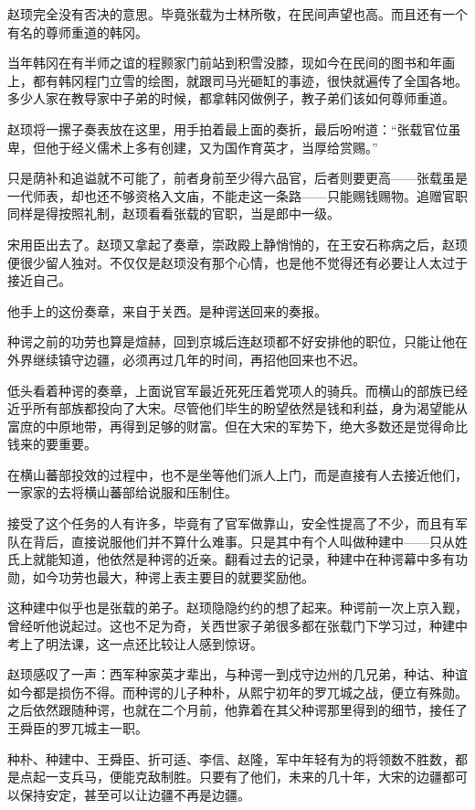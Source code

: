 赵顼完全没有否决的意思。毕竟张载为士林所敬，在民间声望也高。而且还有一个有名的尊师重道的韩冈。

当年韩冈在有半师之谊的程颢家门前站到积雪没膝，现如今在民间的图书和年画上，都有韩冈程门立雪的绘图，就跟司马光砸缸的事迹，很快就遍传了全国各地。多少人家在教导家中子弟的时候，都拿韩冈做例子，教子弟们该如何尊师重道。

赵顼将一摞子奏表放在这里，用手拍着最上面的奏折，最后吩咐道：“张载官位虽卑，但他于经义儒术上多有创建，又为国作育英才，当厚给赏赐。”

只是荫补和追谥就不可能了，前者身前至少得六品官，后者则要更高——张载虽是一代师表，却也还不够资格入文庙，不能走这一条路——只能赐钱赐物。追赠官职同样是得按照礼制，赵顼看看张载的官职，当是郎中一级。

宋用臣出去了。赵顼又拿起了奏章，崇政殿上静悄悄的，在王安石称病之后，赵顼便很少留人独对。不仅仅是赵顼没有那个心情，也是他不觉得还有必要让人太过于接近自己。

他手上的这份奏章，来自于关西。是种谔送回来的奏报。

种谔之前的功劳也算是煊赫，回到京城后连赵顼都不好安排他的职位，只能让他在外界继续镇守边疆，必须再过几年的时间，再招他回来也不迟。

低头看着种谔的奏章，上面说官军最近死死压着党项人的骑兵。而横山的部族已经近乎所有部族都投向了大宋。尽管他们毕生的盼望依然是钱和利益，身为渴望能从富庶的中原地带，再得到足够的财富。但在大宋的军势下，绝大多数还是觉得命比钱来的要重要。

在横山蕃部投效的过程中，也不是坐等他们派人上门，而是直接有人去接近他们，一家家的去将横山蕃部给说服和压制住。

接受了这个任务的人有许多，毕竟有了官军做靠山，安全性提高了不少，而且有军队在背后，直接说服他们并不算什么难事。只是其中有个人叫做种建中——只从姓氏上就能知道，他依然是种谔的近亲。翻看过去的记录，种建中在种谔幕中多有功勋，如今功劳也最大，种谔上表主要目的就要奖励他。

这种建中似乎也是张载的弟子。赵顼隐隐约约的想了起来。种谔前一次上京入觐，曾经听他说起过。这也不足为奇，关西世家子弟很多都在张载门下学习过，种建中考上了明法课，这一点还比较让人感到惊讶。

赵顼感叹了一声：西军种家英才辈出，与种谔一到戍守边州的几兄弟，种诂、种谊如今都是损伤不得。而种谔的儿子种朴，从熙宁初年的罗兀城之战，便立有殊勋。之后依然跟随种谔，也就在二个月前，他靠着在其父种谔那里得到的细节，接任了王舜臣的罗兀城主一职。

种朴、种建中、王舜臣、折可适、李信、赵隆，军中年轻有为的将领数不胜数，都是点起一支兵马，便能克敌制胜。只要有了他们，未来的几十年，大宋的边疆都可以保持安定，甚至可以让边疆不再是边疆。

